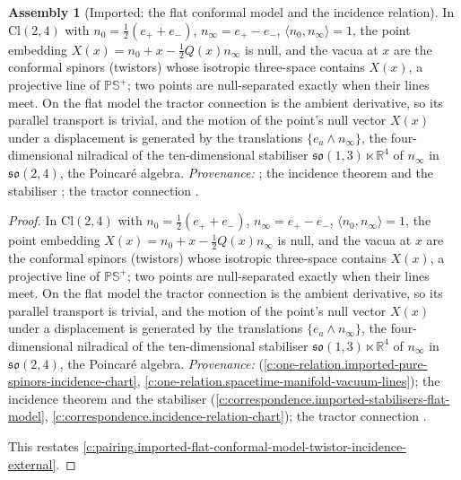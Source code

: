 \documentclass[11pt]{article}
\theoremstyle{definition}
\newtheorem{assembled}[theorem]{Assembly}
\theoremstyle{plain}
\providecommand{\Cl}{}\renewcommand{\Cl}{\mathrm{Cl}}
\providecommand{\PCS}{}\renewcommand{\PCS}{\mathbb{P}{\mathbb{S}^{+}}}
\providecommand{\R}{}\renewcommand{\R}{\mathbb{R}}
\providecommand{\ninf}{}\renewcommand{\ninf}{n_{\infty}}
\providecommand{\nz}{}\renewcommand{\nz}{n_{0}}
\providecommand{\so}{}\renewcommand{\so}{\mathfrak{so}}
\providecommand{\ip}{}\renewcommand{\ip}[2]{\langle #1, #2\rangle}
\begin{document}
\begin{assembled}[Imported: the flat conformal model and the incidence relation]\label{c:pairing.imported-flat-conformal-model-twistor-incidence}
In $\Cl(2,4)$ with $\nz = \tfrac12(e_{+} + e_{-})$, $\ninf = e_{+} - e_{-}$, $\ip{\nz}{\ninf} = 1$, the point embedding $X(x) = \nz + x - \tfrac12 Q(x)\ninf$ is null, and the vacua at $x$ are the conformal spinors (twistors) whose isotropic three-space contains $X(x)$, a projective line of $\PCS$; two points are null-separated exactly when their lines meet. On the flat model the tractor connection is the ambient derivative, so its parallel transport is trivial, and the motion of the point's null vector $X(x)$ under a displacement is generated by the translations $\{e_a \wedge \ninf\}$, the four-dimensional nilradical of the ten-dimensional stabiliser $\so(1,3) \ltimes \R^{4}$ of $\ninf$ in $\so(2,4)$, the Poincar\'e algebra. \emph{Provenance:} \cite[Fact~2.3, Prop.~4.1(2)]{ButlerT16}; the incidence theorem and the stabiliser \cite[Thm.~4.2, Fact~4.3]{ButlerT9}; the tractor connection \cite{BEG1994}.
\end{assembled}
\begin{proof}
In $\Cl(2,4)$ with $\nz = \tfrac12(e_{+} + e_{-})$, $\ninf = e_{+} - e_{-}$, $\ip{\nz}{\ninf} = 1$, the point embedding $X(x) = \nz + x - \tfrac12 Q(x)\ninf$ is null, and the vacua at $x$ are the conformal spinors (twistors) whose isotropic three-space contains $X(x)$, a projective line of $\PCS$; two points are null-separated exactly when their lines meet. On the flat model the tractor connection is the ambient derivative, so its parallel transport is trivial, and the motion of the point's null vector $X(x)$ under a displacement is generated by the translations $\{e_a \wedge \ninf\}$, the four-dimensional nilradical of the ten-dimensional stabiliser $\so(1,3) \ltimes \R^{4}$ of $\ninf$ in $\so(2,4)$, the Poincar\'e algebra. \emph{Provenance:} \cite[Fact~2.3, Prop.~4.1(2)]{ButlerT16} (\ref{c:one-relation.imported-pure-spinors-incidence-chart}, \ref{c:one-relation.spacetime-manifold-vacuum-lines}); the incidence theorem and the stabiliser \cite[Thm.~4.2, Fact~4.3]{ButlerT9} (\ref{c:correspondence.imported-stabilisers-flat-model}, \ref{c:correspondence.incidence-relation-chart}); the tractor connection \cite{BEG1994}.

This restates \ref{c:pairing.imported-flat-conformal-model-twistor-incidence-external}.

\end{proof}
\end{document}
